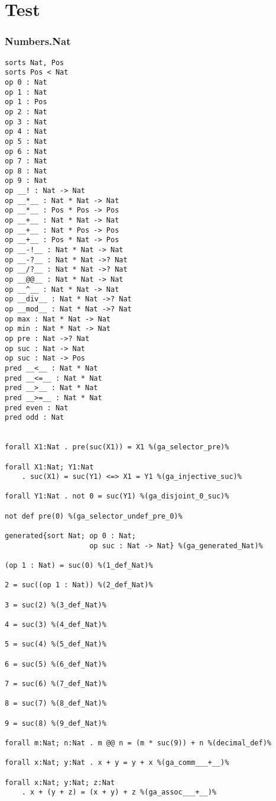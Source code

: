 \documentclass[11pt,a4paper]{article}
\begin{document}
\part*{Test}
\section*{Numbers.Nat}
\begin{verbatim}
sorts Nat, Pos
sorts Pos < Nat
op 0 : Nat
op 1 : Nat
op 1 : Pos
op 2 : Nat
op 3 : Nat
op 4 : Nat
op 5 : Nat
op 6 : Nat
op 7 : Nat
op 8 : Nat
op 9 : Nat
op __! : Nat -> Nat
op __*__ : Nat * Nat -> Nat
op __*__ : Pos * Pos -> Pos
op __+__ : Nat * Nat -> Nat
op __+__ : Nat * Pos -> Pos
op __+__ : Pos * Nat -> Pos
op __-!__ : Nat * Nat -> Nat
op __-?__ : Nat * Nat ->? Nat
op __/?__ : Nat * Nat ->? Nat
op __@@__ : Nat * Nat -> Nat
op __^__ : Nat * Nat -> Nat
op __div__ : Nat * Nat ->? Nat
op __mod__ : Nat * Nat ->? Nat
op max : Nat * Nat -> Nat
op min : Nat * Nat -> Nat
op pre : Nat ->? Nat
op suc : Nat -> Nat
op suc : Nat -> Pos
pred __<__ : Nat * Nat
pred __<=__ : Nat * Nat
pred __>__ : Nat * Nat
pred __>=__ : Nat * Nat
pred even : Nat
pred odd : Nat


forall X1:Nat . pre(suc(X1)) = X1 %(ga_selector_pre)%

forall X1:Nat; Y1:Nat
    . suc(X1) = suc(Y1) <=> X1 = Y1 %(ga_injective_suc)%

forall Y1:Nat . not 0 = suc(Y1) %(ga_disjoint_0_suc)%

not def pre(0) %(ga_selector_undef_pre_0)%

generated{sort Nat; op 0 : Nat;
                    op suc : Nat -> Nat} %(ga_generated_Nat)%

(op 1 : Nat) = suc(0) %(1_def_Nat)%

2 = suc((op 1 : Nat)) %(2_def_Nat)%

3 = suc(2) %(3_def_Nat)%

4 = suc(3) %(4_def_Nat)%

5 = suc(4) %(5_def_Nat)%

6 = suc(5) %(6_def_Nat)%

7 = suc(6) %(7_def_Nat)%

8 = suc(7) %(8_def_Nat)%

9 = suc(8) %(9_def_Nat)%

forall m:Nat; n:Nat . m @@ n = (m * suc(9)) + n %(decimal_def)%

forall x:Nat; y:Nat . x + y = y + x %(ga_comm___+__)%

forall x:Nat; y:Nat; z:Nat
    . x + (y + z) = (x + y) + z %(ga_assoc___+__)%


\end{verbatim}
\end{document}
